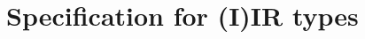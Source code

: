 \documentclass[acmsmall,screen,review,anonymous]{acmart}
\begin{document}
\section{Specification for (I)IR types}\label{sec:specification}





















\end{document}
